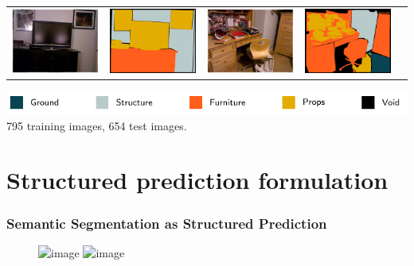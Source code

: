 \documentclass[final,ignorenonframetext,compress]{beamer}
\begin{document}
\begin{frame}
\begin{tabularx}{\linewidth}{@{\extracolsep{\fill}}ccccc}
        \includegraphics[width=.22\textwidth]{images/00191_image.png}&%
        \includegraphics[width=.22\linewidth]{images/00191_gt.png}&
        \includegraphics[width=.22\textwidth]{images/01052_image.png}&%
        \includegraphics[width=.22\linewidth]{images/01052_gt.png}\\

        \end{tabularx}
        \includegraphics[width=\linewidth]{legend.pdf}\\
        795 training images, 654 test images.
    \end{frame}
    

    \section{Structured prediction formulation}

    \begin{frame}
        \frametitle{Semantic Segmentation as Structured Prediction}
        \begin{figure}
            \includegraphics<1>[width=.6\linewidth]{images/00062_pipeline_sp_cheated}
            \includegraphics<2>[width=.6\linewidth]{images/00062_pipeline_sp_graph_cheated}
        \end{figure}
    \end{frame}
\end{document}
